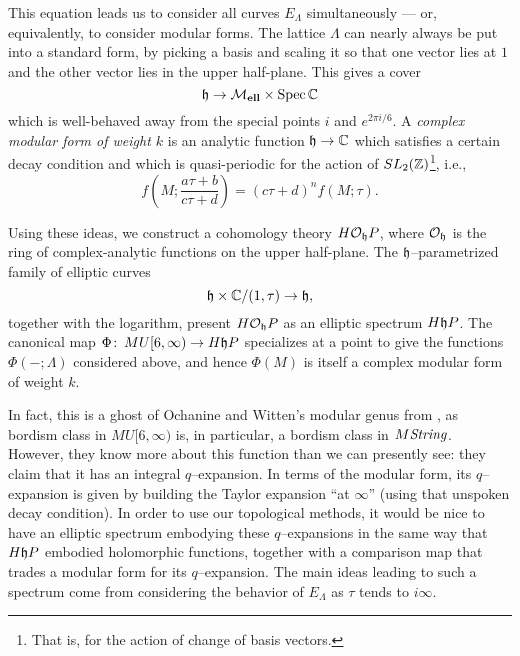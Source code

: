 \begin{example}
This equation leads us to consider all curves $E_\Lambda$ simultaneously --- or, equivalently, to consider modular forms.  The lattice $\Lambda$ can nearly always be put into a standard form, by picking a basis and scaling it so that one vector lies at $1$ and the other vector lies in the upper half-plane.  This gives a cover \[\mathfrak h \to \mathcal{M}_{\mathbf{ell}} \times \operatorname{Spec} \mathbb{C}\] which is well-behaved away from the special points $i$ and $e^{2 \pi i / 6}$.  A \textit{complex modular form of weight $k$} is an analytic function $\mathfrak h \to \mathbb{C}$ which satisfies a certain decay condition and which is quasi-periodic for the action of $SL_2(\mathbb Z)$\footnote{That is, for the action of change of basis vectors.}, i.e., \[f\left(M; \frac{a \tau + b}{c \tau + d} \right) = (c \tau + d)^n f(M; \tau).\]

Using these ideas, we construct a cohomology theory $H \mathcal{O}_{\mathfrak h} P$, where $\mathcal{O}_{\mathfrak h}$ is the ring of complex-analytic functions on the upper half-plane.  The $\mathfrak h$--parametrized family of elliptic curves \[\mathfrak h \times \mathbb{C} / (1, \tau) \to \mathfrak h,\] together with the logarithm, present $H \mathcal{O}_{\mathfrak h} P$ as an elliptic spectrum $H\mathfrak h P$.  The canonical map $\Phi\colon\thinspace MU[6, \infty) \to H\mathfrak h P$ specializes at a point to give the functions $\Phi(-; \Lambda)$ considered above, and hence $\Phi(M)$ is itself a complex modular form of weight $k$.
\end{example}

In fact, this is a ghost of Ochanine and Witten's modular genus from , as bordism class in $MU[6, \infty)$ is, in particular, a bordism class in $M\mathit{String}$.  However, they know more about this function than we can presently see: they claim that it has an integral $q$--expansion.  In terms of the modular form, its $q$--expansion is given by building the Taylor expansion ``at $\infty$'' (using that unspoken decay condition).  In order to use our topological methods, it would be nice to have an elliptic spectrum embodying these $q$--expansions in the same way that $H\mathfrak h P$ embodied holomorphic functions, together with a comparison map that trades a modular form for its $q$--expansion.  The main ideas leading to such a spectrum come from considering the behavior of $E_\Lambda$ as $\tau$ tends to $i \infty$.

